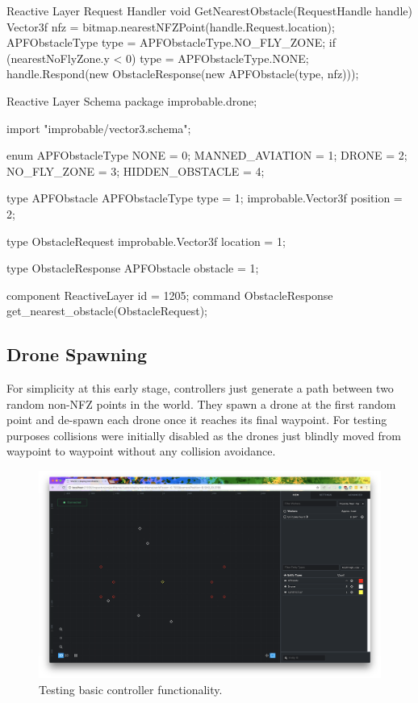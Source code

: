 \documentclass[a4paper,11pt,titlepage]{report}
\begin{document}
\begin{sexylisting}[colback=white]{Reactive Layer Request Handler}
void GetNearestObstacle(RequestHandle handle)
{
  Vector3f nfz = bitmap.nearestNFZPoint(handle.Request.location);
  APFObstacleType type = APFObstacleType.NO_FLY_ZONE;
  if (nearestNoFlyZone.y < 0)
  {
    type = APFObstacleType.NONE;
  }
  handle.Respond(new ObstacleResponse(new APFObstacle(type, nfz)));
}
\end{sexylisting}

\begin{sexylisting}[colback=white]{Reactive Layer Schema}
package improbable.drone;

import "improbable/vector3.schema";

enum APFObstacleType {
  NONE = 0;
  MANNED_AVIATION = 1;
  DRONE = 2;
  NO_FLY_ZONE = 3;
  HIDDEN_OBSTACLE = 4;
}

type APFObstacle{
  APFObstacleType type = 1;
  improbable.Vector3f position = 2;
}

type ObstacleRequest {
  improbable.Vector3f location = 1;
}

type ObstacleResponse {
  APFObstacle obstacle = 1;
}

component ReactiveLayer {
  id = 1205;
  command ObstacleResponse get_nearest_obstacle(ObstacleRequest);
}
\end{sexylisting}

\subsection{Drone Spawning}
For simplicity at this early stage, controllers just generate a path between two random non-NFZ points in the world. They spawn a drone at the first random point and de-spawn each drone once it reaches its final waypoint. For testing purposes collisions were initially disabled as the drones just blindly moved from waypoint to waypoint without any collision avoidance.

\begin{figure}[!hbpt]
  \center
  \includegraphics[width=\linewidth]{img/gdoc1.png}
  \caption{Testing basic controller functionality.}
  \label{fig:basic_controller_test}
\end{figure}
\end{document}
